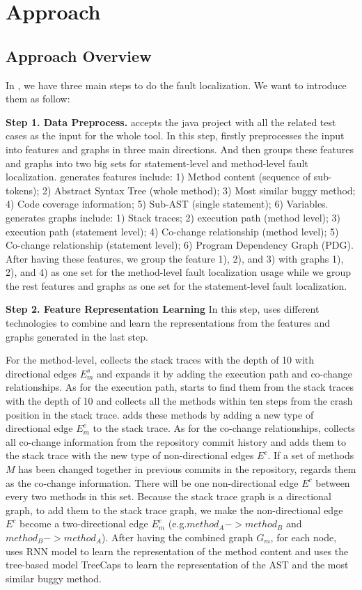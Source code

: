 \section{Approach}
\subsection{Approach Overview}

In \tool, we have three main steps to do the fault localization. We want to introduce them as follow:

{\bf Step 1. Data Preprocess.} \tool accepts the java project with all the related test cases as the input for the whole tool. In this step, \tool firstly preprocesses the input into features and graphs in three main directions. And then \tool groups these features and graphs into two big sets for statement-level and method-level fault localization. \tool generates features include: 1) Method content (sequence of sub-tokens); 2) Abstract Syntax Tree (whole method); 3) Most similar buggy method; 4) Code coverage information; 5) Sub-AST (single statement); 6) Variables. \tool generates graphs include: 1) Stack traces; 2) execution path (method level); 3) execution path (statement level); 4) Co-change relationship (method level); 5) Co-change relationship (statement level); 6) Program Dependency Graph (PDG). After having these features, we group the feature 1), 2), and 3) with graphs 1), 2), and 4) as one set for the method-level fault localization usage while we group the rest features and graphs as one set for the statement-level fault localization.

{\bf Step 2. Feature Representation Learning} In this step, \tool uses different technologies to combine and learn the representations from the features and graphs generated in the last step. 

For the method-level, \tool collects the stack traces with the depth of 10 with directional edges $E_m^s$ and expands it by adding the execution path and co-change relationships. As for the execution path, \tool starts to find them from the stack traces with the depth of 10 and collects all the methods within ten steps from the crash position in the stack trace. \tool adds these methods by adding a new type of directional edge $E_m^e$ to the stack trace. As for the co-change relationships, \tool collects all co-change information from the repository commit history and adds them to the stack trace with the new type of non-directional edges $E^c$. If a set of methods $M$ has been changed together in previous commits in the repository, \tool regards them as the co-change information. There will be one non-directional edge $E^c$ between every two methods in this set. Because the stack trace graph is a directional graph, to add them to the stack trace graph, we make the non-directional edge $E^c$ become a two-directional edge $E_m^c$ (e.g.$method_A -> method_B$ and $method_B -> method_A$). After having the combined graph $G_m$, for each node, \tool uses RNN model \cite{cho2014learning} to learn the representation of the method content and uses the tree-based model TreeCaps \cite{bui2021treecaps} to learn the representation of the AST and the most similar buggy method. 

